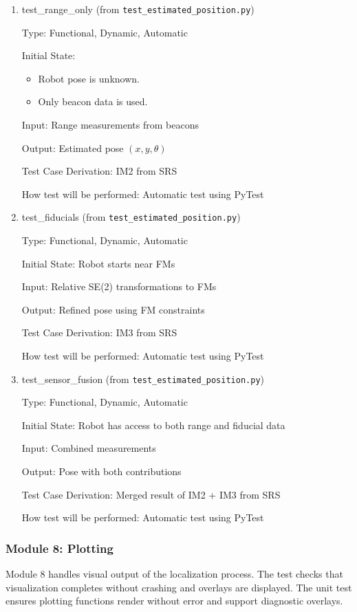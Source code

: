 \documentclass[12pt, titlepage]{article}
\begin{document}
\begin{enumerate}
  \item{test\_range\_only (from \texttt{test\_estimated\_position.py})}

  Type: Functional, Dynamic, Automatic
            
  Initial State:  
  \begin{itemize}
    \item Robot pose is unknown.
    \item Only beacon data is used.
  \end{itemize}
            
  Input: Range measurements from beacons
            
  Output: Estimated pose $(x, y, \theta)$
  
  Test Case Derivation: IM2 from SRS
  
  How test will be performed: Automatic test using PyTest
            
  \item{test\_fiducials (from \texttt{test\_estimated\_position.py})}
  
  Type: Functional, Dynamic, Automatic
            
  Initial State: Robot starts near FMs
            
  Input: Relative SE(2) transformations to FMs
            
  Output: Refined pose using FM constraints
  
  Test Case Derivation: IM3 from SRS
  
  How test will be performed: Automatic test using PyTest
  
  \item{test\_sensor\_fusion (from \texttt{test\_estimated\_position.py})}
  
  Type: Functional, Dynamic, Automatic
            
  Initial State: Robot has access to both range and fiducial data
            
  Input: Combined measurements
            
  Output: Pose with both contributions
  
  Test Case Derivation: Merged result of IM2 + IM3 from SRS
  
  How test will be performed: Automatic test using PyTest
\end{enumerate}

\subsubsection{Module 8: Plotting}
Module 8 handles visual output of the localization process. The test checks that visualization completes without crashing and overlays are displayed. The unit test ensures plotting functions render without error and support diagnostic overlays.
\end{document}
